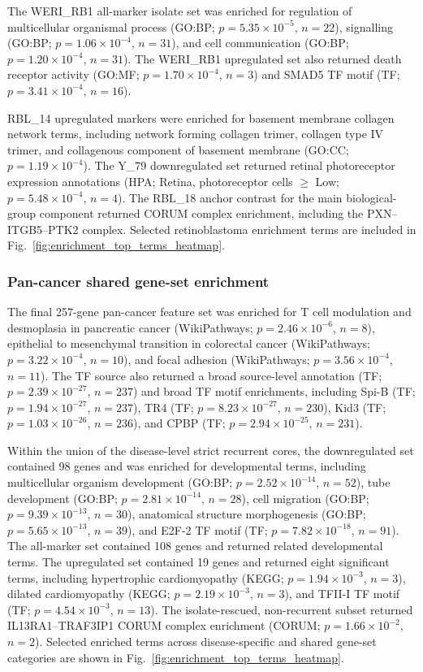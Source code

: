 The WERI\_RB1 all-marker isolate set was enriched for regulation of multicellular
organismal process (GO:BP; $p = 5.35 \times 10^{-5}$, $n = 22$),
signalling (GO:BP; $p = 1.06 \times 10^{-4}$, $n = 31$), and cell
communication (GO:BP; $p = 1.20 \times 10^{-4}$, $n = 31$). The
WERI\_RB1 upregulated set also returned death receptor activity
(GO:MF; $p = 1.70 \times 10^{-4}$, $n = 3$) and SMAD5 TF motif
(TF; $p = 3.41 \times 10^{-4}$, $n = 16$).

RBL\_14 upregulated markers were enriched for basement membrane collagen
network terms, including network forming collagen trimer, collagen type IV
trimer, and collagenous component of basement membrane
(GO:CC; $p = 1.19 \times 10^{-4}$). The Y\_79 downregulated set returned
retinal photoreceptor expression annotations (HPA; Retina, photoreceptor
cells $\geq$ Low; $p = 5.48 \times 10^{-4}$, $n = 4$). The RBL\_18 anchor
contrast for the main biological-group component returned CORUM complex
enrichment, including the PXN--ITGB5--PTK2 complex. Selected retinoblastoma
enrichment terms are included in Fig.~\ref{fig:enrichment_top_terms_heatmap}.

\subsubsection{Pan-cancer shared gene-set enrichment}

The final 257-gene pan-cancer feature set was enriched for T cell modulation
and desmoplasia in pancreatic cancer
(WikiPathways; $p = 2.46 \times 10^{-6}$,
$n = 8$), epithelial to mesenchymal transition in colorectal cancer
(WikiPathways; $p = 3.22 \times 10^{-4}$, $n = 10$), and focal adhesion
(WikiPathways; $p = 3.56 \times 10^{-4}$, $n = 11$). The TF source also
returned a broad source-level annotation (TF; $p = 2.39 \times 10^{-27}$,
$n = 237$) and broad TF motif enrichments, including Spi-B
(TF; $p = 1.94 \times 10^{-27}$, $n = 237$), TR4
(TF; $p = 8.23 \times 10^{-27}$, $n = 230$), Kid3
(TF; $p = 1.03 \times 10^{-26}$, $n = 236$), and CPBP
(TF; $p = 2.94 \times 10^{-25}$, $n = 231$).

Within the union of the disease-level strict recurrent cores, the
downregulated set contained 98 genes and was enriched for developmental terms,
including multicellular organism development
(GO:BP; \(p = 2.52 \times 10^{-14}\), \(n = 52\)), tube development
(GO:BP; \(p = 2.81 \times 10^{-14}\), \(n = 28\)), cell migration
(GO:BP; \(p = 9.39 \times 10^{-13}\), \(n = 30\)), anatomical structure
morphogenesis (GO:BP; \(p = 5.65 \times 10^{-13}\), \(n = 39\)), and
E2F-2 TF motif (TF; \(p = 7.82 \times 10^{-18}\), \(n = 91\)). The
all-marker set contained 108 genes and returned related developmental
terms. The upregulated set contained 19 genes and returned eight significant
terms, including hypertrophic cardiomyopathy
(KEGG; \(p = 1.94 \times 10^{-3}\), \(n = 3\)),
dilated cardiomyopathy
(KEGG; \(p = 2.19 \times 10^{-3}\), \(n = 3\)), and
TFII-I TF motif (TF; $p = 4.54 \times 10^{-3}$, $n = 13$). The
isolate-rescued, non-recurrent subset returned IL13RA1--TRAF3IP1 CORUM complex
enrichment (CORUM; $p = 1.66 \times 10^{-2}$, $n = 2$). Selected enriched
terms across disease-specific and shared gene-set categories are shown in
Fig.~\ref{fig:enrichment_top_terms_heatmap}.

